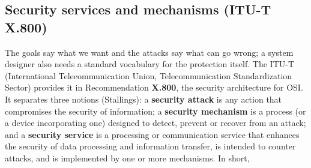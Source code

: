 \subsection{Security services and mechanisms (ITU-T X.800) \hot}

The goals say what we want and the attacks say what can go wrong; a system designer also needs a standard vocabulary for the protection itself. The ITU-T (International Telecommunication Union, Telecommunication Standardization Sector) provides it in Recommendation \textbf{X.800}, the security architecture for OSI. It separates three notions (Stallings): a \textbf{security attack} is any action that compromises the security of information; a \textbf{security mechanism} is a process (or a device incorporating one) designed to detect, prevent or recover from an attack; and a \textbf{security service} is a processing or communication service that enhances the security of data processing and information transfer, is intended to counter attacks, and is implemented by one or more mechanisms. In short, 

